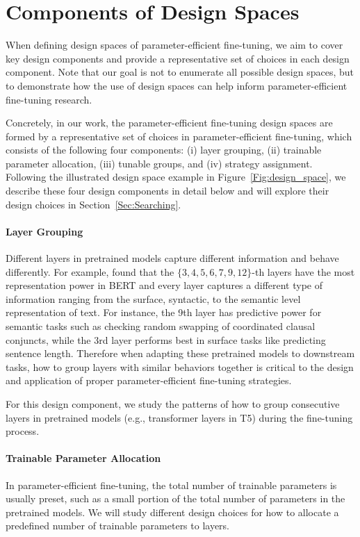 \section{Components of Design Spaces}
\label{sec:Components of Design Spaces} When defining design spaces of parameter-efficient fine-tuning, we aim to cover key design components and provide a representative set of choices in each design component. Note that our goal is not to enumerate all possible design spaces, but to demonstrate how the use of design spaces can help inform parameter-efficient fine-tuning research.

Concretely, in our work, the parameter-efficient fine-tuning design spaces are formed by a representative set of choices in parameter-efficient fine-tuning, which consists of the following four components: (i) layer grouping, (ii) trainable parameter allocation, (iii) tunable groups, and (iv) strategy assignment. Following the illustrated design space example in Figure~\ref{Fig:design_space},
we describe these four design components in detail below and will explore their design choices in Section~\ref{Sec:Searching}.

\paragraph{Layer Grouping} Different layers in pretrained models capture different information and behave differently. For example, \citet{jawahar-etal-2019-bert} found that the $\{3,4,5,6,7,9,12\}$-th layers have the most representation power in BERT and every layer captures a different type of information ranging from the surface, syntactic, to the semantic level representation of text. For instance, the 9th layer has predictive power for semantic tasks such as checking random swapping of coordinated clausal conjuncts, while the 3rd layer performs best in surface tasks like predicting sentence length. Therefore when adapting these pretrained models to downstream tasks, how to group layers with similar behaviors together is critical to the design and application of proper parameter-efficient fine-tuning strategies.

For this design component, we study the patterns of how to group consecutive layers in pretrained models (e.g., transformer layers in T5) during the fine-tuning process.

\paragraph{Trainable Parameter Allocation} In parameter-efficient fine-tuning, the total number of trainable parameters is usually preset, such as a small portion of the total number of parameters in the pretrained models. We will study different design choices for how to allocate a predefined number of trainable parameters to layers.


